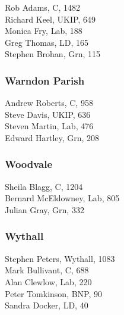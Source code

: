 \documentclass[a4paper,openany,10pt]{book}
\begin{document}


Rob Adams, C, 1482\\
Richard Keel, UKIP, 649\\
Monica Fry, Lab, 188\\
Greg Thomas, LD, 165\\
Stephen Brohan, Grn, 115\\


\subsubsection*{Warndon Parish}



Andrew Roberts, C, 958\\
Steve Davis, UKIP, 636\\
Steven Martin, Lab, 476\\
Edward Hartley, Grn, 208\\


\subsubsection*{Woodvale}



Sheila Blagg, C, 1204\\
Bernard McEldowney, Lab, 805\\
Julian Gray, Grn, 332\\


\subsubsection*{Wythall}



Stephen Peters, Wythall, 1083\\
Mark Bullivant, C, 688\\
Alan Clewlow, Lab, 220\\
Peter Tomkinson, BNP, 90\\
Sandra Docker, LD, 40\\
\end{document}
